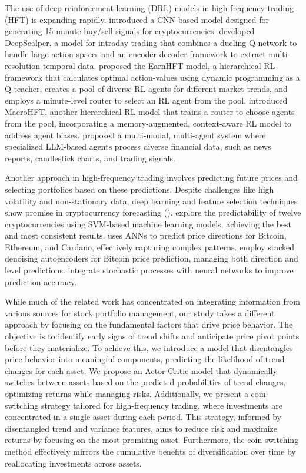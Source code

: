 The use of deep reinforcement learning (DRL) models in high-frequency trading (HFT) is expanding rapidly. \citet{asare2024deep} introduced a CNN-based model designed for generating 15-minute buy/sell signals for cryptocurrencies. \citet{sun2022deepscalper} developed DeepScalper, a model for intraday trading that combines a dueling Q-network to handle large action spaces and an encoder-decoder framework to extract multi-resolution temporal data. \citet{qin2024earnhft} proposed the EarnHFT model, a hierarchical RL framework that calculates optimal action-values using dynamic programming as a Q-teacher, creates a pool of diverse RL agents for different market trends, and employs a minute-level router to select an RL agent from the pool. \citet{zong2024macrohft} introduced MacroHFT, another hierarchical RL model that trains a router to choose agents from the pool, incorporating a memory-augmented, context-aware RL model to address agent biases. \citet{fatemi2024finvision} proposed a multi-modal, multi-agent system where specialized LLM-based agents process diverse financial data, such as news reports, candlestick charts, and trading signals.

Another approach in high-frequency trading involves predicting future prices and selecting portfolios based on these predictions. Despite challenges like high volatility and non-stationary data, deep learning and feature selection techniques show promise in cryptocurrency forecasting (\citet{otabek2024prediction}). \citet{akyildirim2021prediction} explore the predictability of twelve cryptocurrencies using SVM-based machine learning models, achieving the best and most consistent results. \citet{ye2021predicting} uses ANNs to predict price directions for Bitcoin, Ethereum, and Cardano, effectively capturing complex patterns. \citet{liu2021forecasting} employ stacked denoising autoencoders for Bitcoin price prediction, managing both direction and level predictions. \citet{jay2020stochastic} integrate stochastic processes with neural networks to improve prediction accuracy.

While much of the related work has concentrated on integrating information from various sources for stock portfolio management, our study takes a different approach by focusing on the fundamental factors that drive price behavior. The objective is to identify early signs of trend shifts and anticipate price pivot points before they materialize. To achieve this, we introduce a model that disentangles price behavior into meaningful components, predicting the likelihood of trend changes for each asset. We propose an Actor-Critic model that dynamically switches between assets based on the predicted probabilities of trend changes, optimizing returns while managing risks. Additionally, we present a coin-switching strategy tailored for high-frequency trading, where investments are concentrated in a single asset during each period. This strategy, informed by disentangled trend and variance features, aims to reduce risk and maximize returns by focusing on the most promising asset. Furthermore, the coin-switching method effectively mirrors the cumulative benefits of diversification over time by reallocating investments across assets.